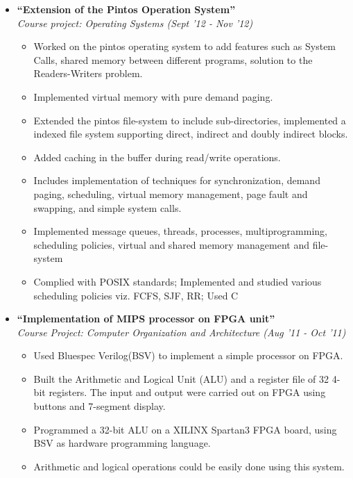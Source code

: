 \documentclass[margin,line]{resume}
\begin{document}
\begin{resume}
\begin{itemize}
  \item \large{\textbf{\textsf{``Extension of the Pintos Operation System''}}}
    \\ \small{\textit{Course project: Operating Systems (Sept '12 - Nov '12)}}
    \normalsize
    \begin{itemize}
    \item Worked on the pintos operating system to add features such as System Calls, shared memory between different programs, solution to the Readers-Writers problem.
    \item Implemented virtual memory with pure demand paging.
    \item Extended the pintos file-system to include sub-directories, implemented a indexed file system supporting direct, indirect and doubly indirect blocks.
    \item Added caching in the buffer during read/write operations.
    \item Includes implementation of techniques for synchronization, demand paging, scheduling, virtual memory management, page fault and swapping, and simple system calls.
    \item Implemented message queues, threads, processes, multiprogramming, scheduling policies, virtual and shared memory management and file-system
    \item Complied with POSIX standards; Implemented and studied various scheduling policies viz. FCFS, SJF, RR; Used C
    \end{itemize}

  \item \large{\textbf{\textsf{``Implementation of MIPS processor on FPGA unit''}}}
    \\ \small{\textit{Course Project: Computer Organization and Architecture (Aug '11 - Oct '11)}}
    \normalsize
    \begin{itemize}
    \item Used Bluespec Verilog(BSV) to implement a simple processor on FPGA.
    \item Built the Arithmetic and Logical Unit (ALU) and a register file of 32 4-bit registers. The input and output were carried out on FPGA using buttons and 7-segment display.  
    \item Programmed a 32-bit ALU on a XILINX Spartan3 FPGA board, using BSV as hardware programming language.
    \item Arithmetic and logical operations could be easily done using this system.
    \end{itemize}


\end{itemize}
\end{resume}
\end{document}
